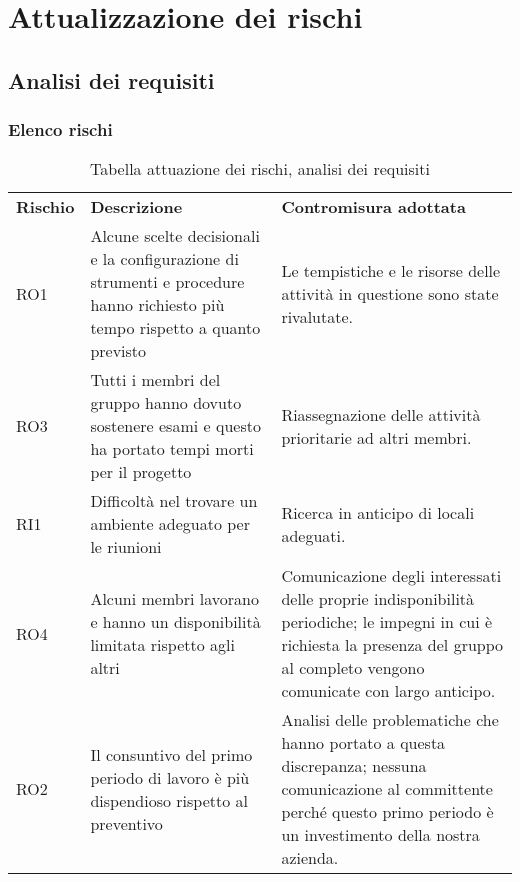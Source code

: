 \section{Attualizzazione dei rischi}
\subsection{Analisi dei requisiti}
\subsubsection{Elenco rischi}
\begin{longtable}{|p{2cm}|p{6cm}|p{6cm}|}
	\arrayrulecolor{white}
	\caption{Tabella attuazione dei rischi, analisi dei requisiti}\\ 
	\hline
	\rowcolor{header}
	\textbf{Rischio} & \textbf{Descrizione} & \textbf{Contromisura adottata} \\
	\hline
	RO1              & Alcune scelte decisionali e la configurazione di strumenti e procedure hanno richiesto più tempo rispetto a quanto previsto & Le tempistiche e le risorse delle attività in questione sono state rivalutate.                                                                                                   \\
	RO3              & Tutti i membri del gruppo hanno dovuto sostenere esami e questo ha portato tempi morti per il progetto                      & Riassegnazione delle attività prioritarie ad altri membri.                                                                                                                        \\
	RI1              & Difficoltà nel trovare un ambiente adeguato per le riunioni                                                                 & Ricerca in anticipo di locali adeguati.                                                                                                                                          \\
	RO4              & Alcuni membri lavorano e hanno un disponibilità limitata rispetto agli altri                                                & Comunicazione degli interessati delle proprie indisponibilità periodiche; le impegni in cui è richiesta la presenza del gruppo al completo vengono comunicate con largo anticipo. \\
	RO2              & Il consuntivo del primo periodo di lavoro è più dispendioso rispetto al preventivo                                          & Analisi delle problematiche che hanno portato a questa discrepanza; nessuna comunicazione al committente perché questo primo periodo è un investimento della nostra azienda.     
\end{longtable}


